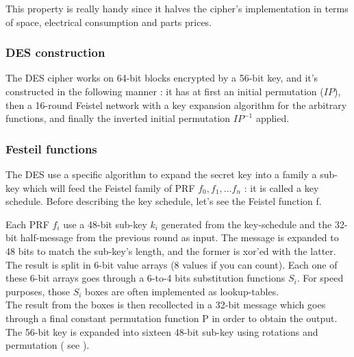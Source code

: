 This property is really handy since it halves the cipher's implementation in terms of space, electrical consumption and parts prices.

\subsubsection{ DES construction }

The DES cipher works on 64-bit blocks encrypted by a 56-bit key, and it's constructed in the following manner : it has at first an initial permutation ($IP$), then a 16-round Feistel network with a key expansion algorithm for the arbitrary functions, and finally the inverted initial permutation $IP^{-1}$ applied.

\subsubsection{Festeil functions}

The DES use a specific algorithm to expand the secret key into a family a sub-key which will feed the Feistel family of PRF $f_0,f_1,\dots f_n$ : it is called a key schedule. Before describing the key schedule, let's see the Feistel function f. 

Each PRF $f_i$ use a 48-bit sub-key $k_i$ generated from the key-schedule and the 32-bit half-message from the previous round as input. The message is expanded to 48 bits to match the sub-key's length, and the former is xor'ed with the latter.\\
The result is split in 6-bit value arrays (8 values if you can count). Each one of these 6-bit arrays goes through a 6-to-4 bits substitution functions $S_i$. For speed purposes, those $S_i$ boxes are often implemented as lookup-tables. \\
The result from the boxes is then recollected in a 32-bit message which goes through a final constant permutation function P in order to obtain the output. \\

The 56-bit key is expanded into sixteen 48-bit sub-key using rotations and permutation ( see \cite{DES-wikipedia} ).

